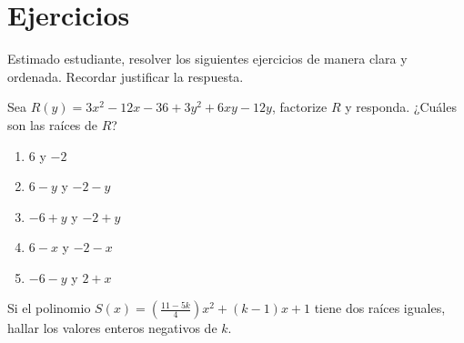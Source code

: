 \section*{\large Ejercicios}

Estimado estudiante, resolver los siguientes ejercicios de manera clara y ordenada. Recordar justificar la respuesta.

\begin{exercise}
    Sea $R(y) = 3x^2 - 12x - 36 + 3y^2 + 6xy - 12y$, factorize $R$ y responda. ¿Cuáles son las raíces de $R$?
    \begin{multicols}{3}
        \begin{enumerate}
            \item $6$ y $-2$
            \item $6 - y$ y $-2 - y$
            \item $-6 + y$ y $-2 + y$
            \item $6 - x$ y $-2 - x$
            \item $-6 - y$ y $2 + x$
        \end{enumerate}
    \end{multicols}
\end{exercise}

\begin{exercise}
    Si el polinomio $S(x) = \left( \frac{11 - 5k}{4} \right) x^2 + (k - 1)x + 1$ tiene dos raíces iguales, hallar los valores enteros negativos de $k$.
\end{exercise}


\newpage

